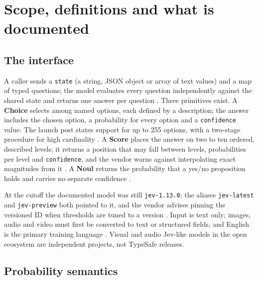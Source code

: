 \section{Scope, definitions and what is documented}\label{sec:scope-definitions-and-what-is-documented}

\subsection{The interface}

A caller sends a \texttt{state} (a string, JSON object or array of text values) and a map of typed questions; the model evaluates every question independently against the shared state and returns one answer per question \citep{typesafe2026state,typesafe2026primitives}. Three primitives exist. A \textbf{Choice} selects among named options, each defined by a description; the answer includes the chosen option, a probability for every option and a \texttt{confidence} value. The launch post states support for up to 255 options, with a two-stage procedure for high cardinality \citep{typesafe2026launch}. A \textbf{Score} places the answer on two to ten ordered, described levels; it returns a position that may fall between levels, probabilities per level and \texttt{confidence}, and the vendor warns against interpolating exact magnitudes from it \citep{typesafe2026jaggedness}. A \textbf{Noul} returns the probability that a yes/no proposition holds and carries no separate confidence \citep{typesafe2026primitives,typesafe2026confidence}.

At the cutoff the documented model was still \texttt{jev-1.13.0}; the aliases \texttt{jev-latest} and \texttt{jev-preview} both pointed to it, and the vendor advises pinning the versioned ID when thresholds are tuned to a version \citep{typesafe2026models}. Input is text only; images, audio and video must first be converted to text or structured fields, and English is the primary training language \citep{typesafe2026models,typesafe2026state}. Visual and audio Jev-like models in the open ecosystem are independent projects, not TypeSafe releases.

\subsection{Probability semantics}

